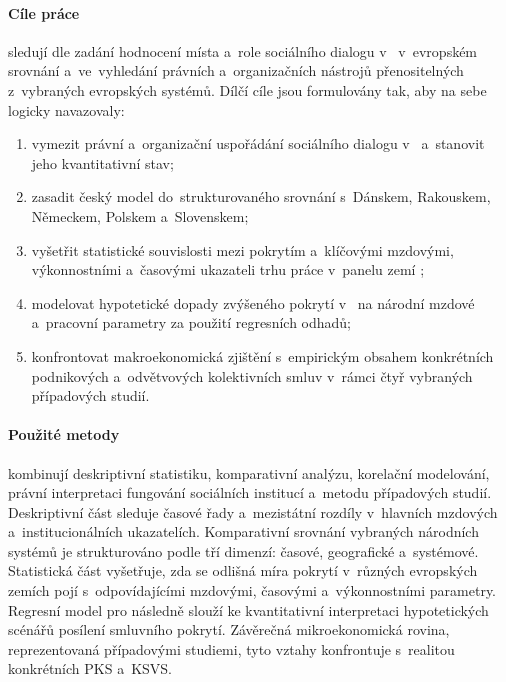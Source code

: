 \paragraph{Cíle práce}\label{par:cile} sledují dle zadání hodnocení místa a~role sociálního dialogu v~ v~evropském srovnání a~ve~vyhledání právních a~organizačních nástrojů přenositelných z~vybraných evropských systémů. Dílčí cíle jsou formulovány tak, aby na sebe logicky navazovaly:
\begin{enumerate}[label = (\roman*),noitemsep]
  \item vymezit právní a~organizační uspořádání sociálního dialogu v~ a~stanovit jeho kvantitativní stav;
  \item zasadit český model do~strukturovaného srovnání s~Dánskem, Rakouskem, Německem, Polskem a~Slovenskem;
  \item vyšetřit statistické souvislosti mezi pokrytím  a~klíčovými mzdovými, výkonnostními a~časovými ukazateli trhu práce v~panelu zemí ;
  \item modelovat hypotetické dopady zvýšeného pokrytí  v~ na národní mzdové a~pracovní parametry za použití regresních odhadů;
  \item konfrontovat makroekonomická zjištění s~empirickým obsahem konkrétních podnikových a~odvětvových kolektivních smluv v~rámci čtyř vybraných případových studií.
\end{enumerate}

\paragraph{Použité metody}\label{par:metody} kombinují deskriptivní statistiku, komparativní analýzu, korelační modelování, právní interpretaci fungování sociálních institucí a~metodu případových studií. Deskriptivní část sleduje časové řady a~mezistátní rozdíly v~hlavních mzdových a~institucionálních ukazatelích. Komparativní srovnání vybraných národních systémů je strukturováno podle tří dimenzí: časové, geografické a~systémové. Statistická část vyšetřuje, zda se odlišná míra pokrytí  v~různých evropských zemích pojí s~odpovídajícími mzdovými, časovými a~výkonnostními parametry. Regresní model pro  následně slouží ke kvantitativní interpretaci hypotetických scénářů posílení smluvního pokrytí. Závěrečná mikroekonomická rovina, reprezentovaná případovými studiemi, tyto vztahy konfrontuje s~realitou konkrétních PKS a~KSVS.

